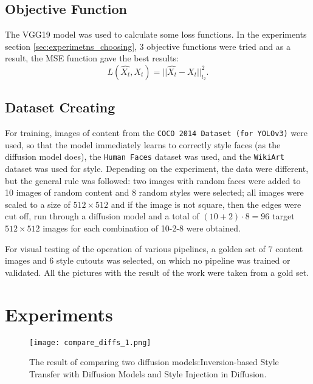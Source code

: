 \documentclass{article}
\begin{document}
\subsection{Objective Function}
The VGG19 model \cite{method 20} was used to calculate some loss functions. In the experiments section \ref{sec:experimetns_choosing}, 3 objective functions were tried and as a result, the MSE function gave the best results:
$$ L(\hat{X_{t}}, X_{t}) = ||\hat{X_{t}} - X_{t} ||^2_{l_2}.$$


\subsection{Dataset Creating}
For training, images of content from the \texttt{COCO 2014 Dataset (for YOLOv3)} were used, so that the model immediately learns to correctly style faces (as the diffusion model does), the \texttt{Human Faces} dataset was used, and the \texttt{WikiArt} dataset was used for style. Depending on the experiment, the data were different, but the general rule was followed: two images with random faces were added to 10 images of random content and 8 random styles were selected; all images were scaled to a size of $512\times512$ and if the image is not square, then the edges were cut off, run through a diffusion model and a total of $(10 + 2) \cdot 8 = 96$ target $512\times512$ images for each combination of 10-2-8 were obtained.

For visual testing of the operation of various pipelines, a golden set of 7 content images and 6 style cutouts was selected, on which no pipeline was trained or validated. All the pictures with the result of the work were taken from a gold set.


\section{Experiments}
\begin{figure}[h]
    \centering
    \texttt{[image: compare\_diffs\_1.png]}
    \caption{The result of comparing two diffusion models:Inversion-based Style Transfer with Diffusion Models and Style Injection in Diffusion.}\label{fig:compare_diffs_models}
\end{figure}
\label{sec:experimetns}
\end{document}
